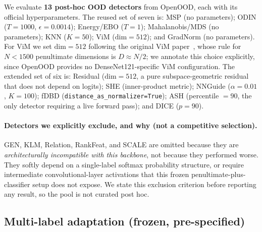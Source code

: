 \documentclass{article}
\begin{document}
We evaluate \textbf{13 post-hoc OOD detectors} from OpenOOD, each with its
official hyperparameters. The reused set of seven is: MSP (no parameters); ODIN
($T=1000$, $\epsilon=0.0014$); Energy/EBO ($T=1$); Mahalanobis/MDS (no
parameters); KNN ($K=50$); ViM ($\text{dim}=512$); and GradNorm (no parameters).
For ViM we set $\text{dim}=512$ following the original ViM
paper~\citep{wang2022vim}, whose rule for $N<1500$ penultimate dimensions is
$D \approx N/2$; we annotate this choice explicitly, since OpenOOD provides no
DenseNet121-specific ViM configuration. The extended set of six is: Residual
($\text{dim}=512$, a pure subspace-geometric residual that does not depend on
logits); SHE (inner-product metric); NNGuide ($\alpha=0.01$, $K=100$); fDBD
(\texttt{distance\_as\_normalizer=True}); ASH (percentile $=90$, the only
detector requiring a live forward pass); and DICE ($p=90$).

\paragraph{Detectors we explicitly exclude, and why (not a competitive
selection).} GEN, KLM, Relation, RankFeat, and SCALE are omitted because they
are \emph{architecturally incompatible with this backbone}, not because they
performed worse. They softly depend on a single-label softmax probability
structure, or require intermediate convolutional-layer activations that this
frozen penultimate-plus-classifier setup does not expose. We state this exclusion
criterion before reporting any result, so the pool is not curated post hoc.

\subsection{Multi-label adaptation (frozen, pre-specified)}
\end{document}
